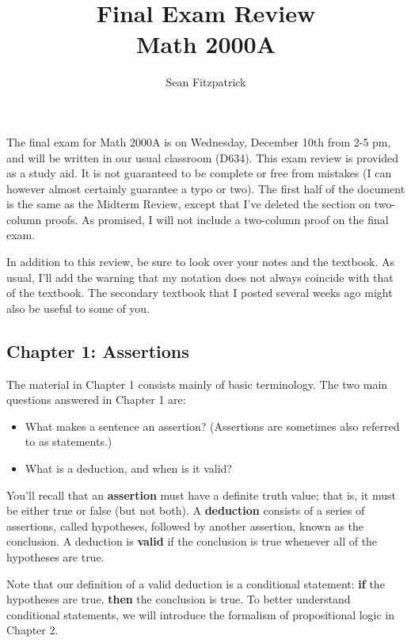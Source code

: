 \documentclass[letterpaper,12pt]{article}
\title{Final Exam Review\\Math 2000A}
\author{Sean Fitzpatrick}
\date{}
\begin{document}
 \maketitle

The final exam for Math 2000A is on Wednesday, December 10th from 2-5 pm, and will be written in our usual classroom (D634). This exam review is provided as a study aid. It is not guaranteed to be complete or free from mistakes (I can however almost certainly guarantee a typo or two). The first half of the document is the same as the Midterm Review, except that I've deleted the section on two-column proofs. As promised, I will not include a two-column proof on the final exam.

In addition to this review, be sure to look over your notes and the textbook. As usual, I'll add the warning that my notation does not always coincide with that of the textbook. The secondary textbook that I posted several weeks ago might also be useful to some of you.

\subsection*{Chapter 1: Assertions}
The material in Chapter 1 consists mainly of basic terminology. The two main questions answered in Chapter 1 are:
\begin{itemize}
 \item What makes a sentence an assertion? (Assertions are sometimes also referred to as statements.)
 \item What is a deduction, and when is it valid?
\end{itemize}
You'll recall that an {\bf assertion} must have a definite truth value; that is, it must be either true or false (but not both). A {\bf deduction} consists of a series of assertions, called hypotheses, followed by another assertion, known as the conclusion. A deduction is {\bf valid} if the conclusion is true whenever all of the hypotheses are true.

Note that our definition of a valid deduction is a conditional statement: {\bf if} the hypotheses are true, {\bf then} the conclusion is true. To better understand conditional statements, we will introduce the formalism of propositional logic in Chapter 2.

\bigskip
\end{document}
